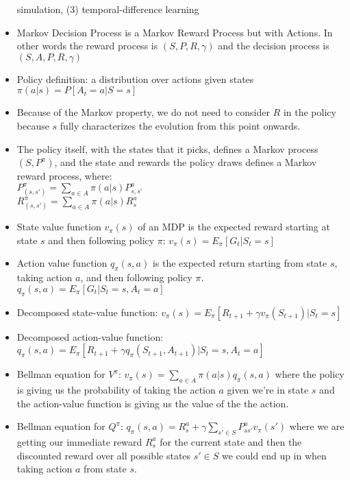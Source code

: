 \documentclass[12pt]{article}
\begin{document}
\begin{itemize}
    simulation, (3) temporal-difference learning
    \item Markov Decision Process is a Markov Reward Process but with Actions. In other
    words the reward process is $(S, P, R, \gamma)$ and the decision process is $(S, A, P, R, \gamma)$
    \item Policy definition: a distribution over actions given states $\pi(a | s) = P[A_t = a | S = s]$
    \item Because of the Markov property, we do not need to consider $R$ in the policy because $s$ fully
    characterizes the evolution from this point onwards.
    \item The policy itself, with the states that it picks, defines a Markov process $(S, P^\pi)$, and 
    the state and rewards the policy draws defines a Markov reward process, where: \\
    $P^\pi_{(s, s')} = \sum_{a \in A}\pi(a | s)P^a_{s, s'}$ \\
    $R^\pi_{(s, s')} = \sum_{a \in A}\pi(a | s)R^a_{s}$
    \item State value function $v_\pi(s)$ of an MDP is the expected reward starting at state $s$
    and then following policy $\pi$: $v_\pi(s) = E_\pi[G_t | S_t = s]$
    \item Action value function $q_\pi(s,a)$ is the expected return starting from state $s$, taking action $a$,
    and then following policy $\pi$. $q_\pi(s,a) = E_\pi[G_t | S_t = s, A_t = a]$
    \item Decomposed state-value function: $v_\pi(s) = E_\pi[R_{t+1} + \gamma v_\pi(S_{t+1}) | S_t = s]$
    \item Decomposed action-value function: $q_\pi(s,a) = E_\pi[R_{t+1} + \gamma q_\pi(S_{t+1}, A_{t+1}) | S_t = s, A_t = a]$
    \item Bellman equation for $V^\pi$: $v_\pi(s) = \sum_{a \in A}\pi(a | s)q_\pi(s, a)$ where the policy is giving us the probability
    of taking the action $a$ given we're in state $s$ and the action-value function is giving us the value of the the action.
    \item Bellman equation for $Q^\pi$: $q_\pi(s, a) = R_s^a + \gamma \sum_{s' \in S}P_{ss'}^a v_\pi(s')$ where
    we are getting our immediate reward $R_s^a$ for the current state and then the discounted reward over all possible states $s' \in S$ we could end
    up in when taking action $a$ from state $s$.
  \end{itemize}
\end{document}
